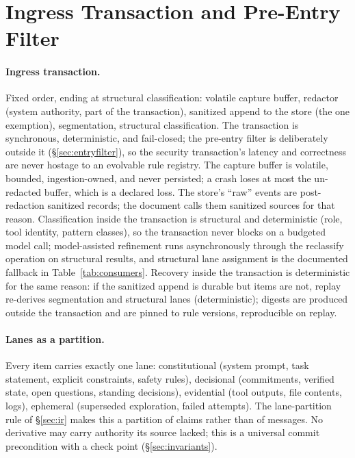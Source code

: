 \documentclass[11pt]{article}
\begin{document}
\section{Ingress Transaction and Pre-Entry Filter}

\paragraph{Ingress transaction.} Fixed order, ending at structural classification: volatile capture buffer, redactor (system authority, part of the transaction), sanitized append to the store (the one exemption), segmentation, structural classification. The transaction is synchronous, deterministic, and fail-closed; the pre-entry filter is deliberately outside it (\S\ref{sec:entryfilter}), so the security transaction's latency and correctness are never hostage to an evolvable rule registry. The capture buffer is volatile, bounded, ingestion-owned, and never persisted; a crash loses at most the un-redacted buffer, which is a declared loss. The store's ``raw'' events are post-redaction sanitized records; the document calls them sanitized sources for that reason. Classification inside the transaction is structural and deterministic (role, tool identity, pattern classes), so the transaction never blocks on a budgeted model call; model-assisted refinement runs asynchronously through the reclassify operation on structural results, and structural lane assignment is the documented fallback in Table~\ref{tab:consumers}. Recovery inside the transaction is deterministic for the same reason: if the sanitized append is durable but items are not, replay re-derives segmentation and structural lanes (deterministic); digests are produced outside the transaction and are pinned to rule versions, reproducible on replay.

\paragraph{Lanes as a partition.} Every item carries exactly one lane: constitutional (system prompt, task statement, explicit constraints, safety rules), decisional (commitments, verified state, open questions, standing decisions), evidential (tool outputs, file contents, logs), ephemeral (superseded exploration, failed attempts). The lane-partition rule of \S\ref{sec:ir} makes this a partition of claims rather than of messages. No derivative may carry authority its source lacked; this is a universal commit precondition with a check point (\S\ref{sec:invariants}).
\end{document}
